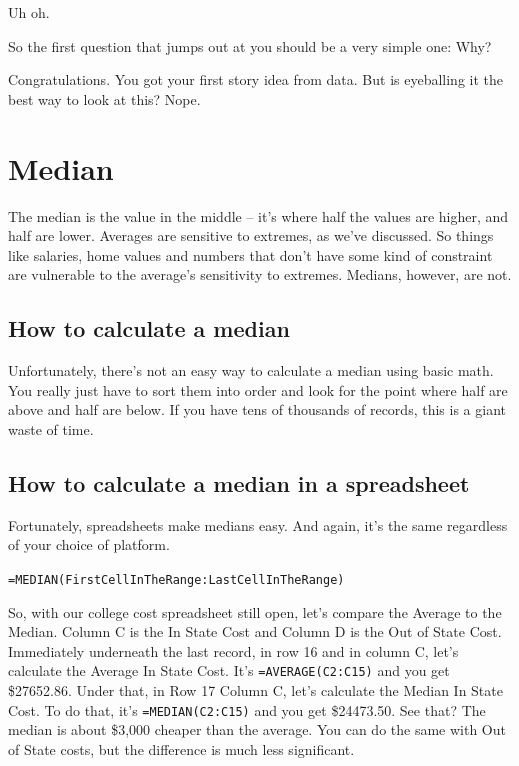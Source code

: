 \documentclass[]{book}
\begin{document}
Uh oh.

So the first question that jumps out at you should be a very simple one: Why?

Congratulations. You got your first story idea from data. But is eyeballing it the best way to look at this? Nope.

\hypertarget{median}{%
\chapter{Median}\label{median}}

The median is the value in the middle -- it's where half the values are higher, and half are lower. Averages are sensitive to extremes, as we've discussed. So things like salaries, home values and numbers that don't have some kind of constraint are vulnerable to the average's sensitivity to extremes. Medians, however, are not.

\hypertarget{how-to-calculate-a-median}{%
\section{How to calculate a median}\label{how-to-calculate-a-median}}

Unfortunately, there's not an easy way to calculate a median using basic math. You really just have to sort them into order and look for the point where half are above and half are below. If you have tens of thousands of records, this is a giant waste of time.

\hypertarget{how-to-calculate-a-median-in-a-spreadsheet}{%
\section{How to calculate a median in a spreadsheet}\label{how-to-calculate-a-median-in-a-spreadsheet}}

Fortunately, spreadsheets make medians easy. And again, it's the same regardless of your choice of platform.

\texttt{=MEDIAN(FirstCellInTheRange:LastCellInTheRange)}

So, with our college cost spreadsheet still open, let's compare the Average to the Median. Column C is the In State Cost and Column D is the Out of State Cost. Immediately underneath the last record, in row 16 and in column C, let's calculate the Average In State Cost. It's \texttt{=AVERAGE(C2:C15)} and you get \$27652.86. Under that, in Row 17 Column C, let's calculate the Median In State Cost. To do that, it's \texttt{=MEDIAN(C2:C15)} and you get \$24473.50. See that? The median is about \$3,000 cheaper than the average. You can do the same with Out of State costs, but the difference is much less significant.
\end{document}
